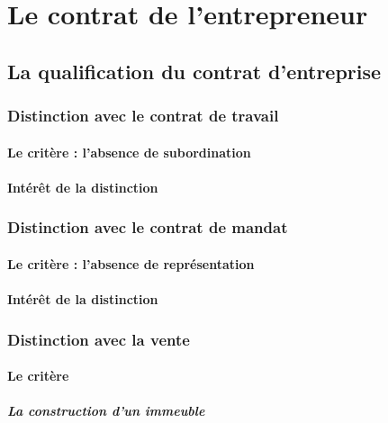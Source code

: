 \chapter{Le contrat de l'entrepreneur}

	\section{La qualification du contrat d'entreprise}
	
		\subsection{Distinction avec le contrat de travail}
		
			\subsubsection{Le critère : l'absence de subordination}
			
			\subsubsection{Intérêt de la distinction}
		
		\subsection{Distinction avec le contrat de mandat}
		
			\subsubsection{Le critère : l'absence de représentation}
			
			\subsubsection{Intérêt de la distinction}
		
		\subsection{Distinction avec la vente}
		
			\subsubsection{Le critère}
			
				\paragraph{La construction d'un immeuble}
				
